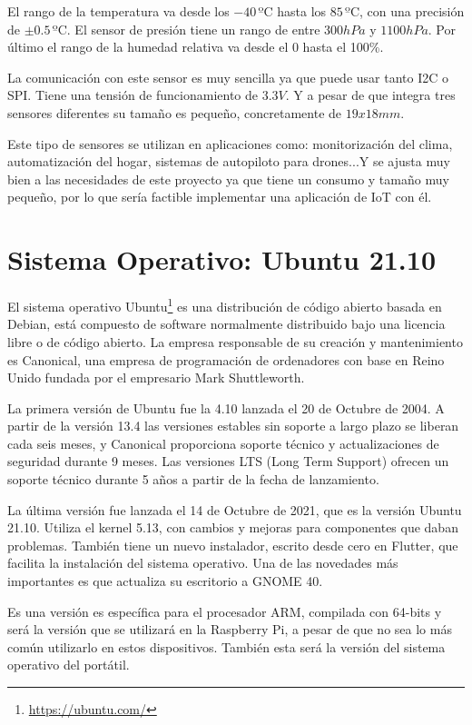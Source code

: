 \documentclass[a4paper, 12pt]{book}
\begin{document}
El rango de la temperatura va desde los $-40\, \mbox{ºC}$ hasta los $85\, \mbox{ºC}$, con una precisión de $\pm 0.5\, \mbox{ºC}$. El sensor de presión tiene un rango de entre $300 hPa$ y $1100 hPa$. Por último el rango de la humedad relativa va desde el 0 hasta el 100\%.

La comunicación con este sensor es muy sencilla ya que puede usar tanto I2C o SPI. Tiene una tensión de funcionamiento de $3.3V$. Y a pesar de que integra tres sensores diferentes su tamaño es pequeño, concretamente de $19x18 mm$.

Este tipo de sensores se utilizan en aplicaciones como: monitorización del clima, automatización del hogar, sistemas de autopiloto para drones...Y se ajusta muy bien a las necesidades de este proyecto ya que tiene un consumo y tamaño muy pequeño, por lo que sería factible implementar una aplicación de IoT con él.


\section{Sistema Operativo: Ubuntu 21.10} 
\label{sec:sistema_operativo}

El sistema operativo Ubuntu\footnote{\url{https://ubuntu.com/}} es una distribución de código abierto basada en Debian, está compuesto de software normalmente distribuido bajo una licencia libre o de código abierto. La empresa responsable de su creación y mantenimiento es Canonical, una empresa de programación de ordenadores con base en Reino Unido fundada por el empresario Mark Shuttleworth.

La primera versión de Ubuntu fue la 4.10 lanzada el 20 de Octubre de 2004. A partir de la versión 13.4 las versiones estables sin soporte a largo plazo se liberan cada seis meses, y Canonical proporciona soporte técnico y actualizaciones de seguridad durante 9 meses. Las versiones LTS (Long Term Support) ofrecen un soporte técnico durante 5 años a partir de la fecha de lanzamiento.

La última versión fue lanzada el 14 de Octubre de 2021, que es la versión Ubuntu 21.10. Utiliza el kernel 5.13, con cambios y mejoras para componentes que daban problemas. También tiene un nuevo instalador, escrito desde cero en Flutter, que facilita la instalación del sistema operativo. Una de las novedades más importantes es que actualiza su escritorio a GNOME 40. 

Es una versión es específica para el procesador ARM, compilada con 64-bits y será la versión que se utilizará en la Raspberry Pi, a pesar de que no sea lo más común utilizarlo en estos dispositivos. También esta será la versión del sistema operativo del portátil.
\end{document}
